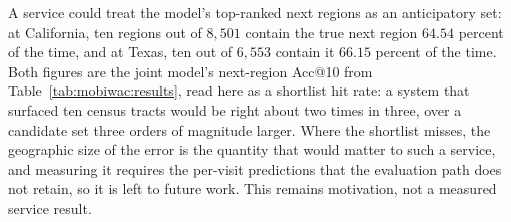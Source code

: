 A service could treat the model's top-ranked next regions as an anticipatory
set: at California, ten regions out of $8{,}501$ contain the true next region $64.54$
percent of the time, and at Texas, ten out of $6{,}553$ contain it $66.15$ percent of the time.
Both figures are the joint model's next-region Acc@10 from
Table~\ref{tab:mobiwac:results}, read here as a shortlist hit rate: a system that surfaced ten
census tracts would be right about two times in three, over a candidate set three orders of
magnitude larger. Where the shortlist misses, the geographic size of the error is the quantity that
would matter to such a service, and measuring it requires the per-visit predictions that the
evaluation path does not retain, so it is left to future work. This remains motivation, not a
measured service result.
